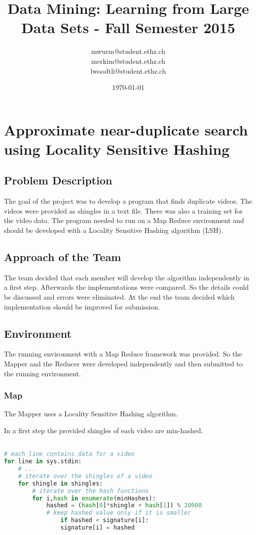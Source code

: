 \documentclass[a4paper, 11pt]{article}
\title{Data Mining: Learning from Large Data Sets - Fall Semester 2015}
\author{mwurm@student.ethz.ch\\ merkim@student.ethz.ch\\ lwoodtli@student.ethz.ch\\}
\date{\today}
\begin{document}
\maketitle

\section*{Approximate near-duplicate search using Locality Sensitive Hashing} 

\subsection{Problem Description}

The goal of the project was to develop a program that finds duplicate videos.
The videos were provided as shingles in a text file. There was also a training
set for the video data.
The program needed to run on a Map Reduce environment and should be developed
with a Locality Sensitive Hashing algorithm (LSH).


\subsection{Approach of the Team}
The team decided that each member will develop the algorithm independently in a first step.
Afterwards the implementations were compared. So the details could be
discussed and errors were eliminated.
At the end the team decided which implementation should be improved for
submission.

\subsection{Environment}
The running environment with a Map Reduce framework was provided. So the
Mapper and the Reducer were developed independently and then submitted to
the running environment.

\subsubsection{Map}

The Mapper uses a Locality Sensitive Hashing algorithm.

In a first step the provided shingles of each video are min-hashed.

\begin{lstlisting}[language=Python]

# each line contains data for a video
for line in sys.stdin:
	# ...
	# iterate over the shingles of a video
	for shingle in shingles:
		# iterate over the hash functions
		for i,hash in enumerate(minHashes):
			hashed = (hash[0]*shingle + hash[1]) % 20000
			# keep hashed value only if it is smaller 
				if hashed < signature[i]:
				signature[i] = hashed
\end{lstlisting}
\end{document}
